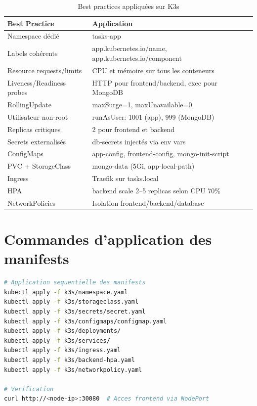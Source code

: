 \documentclass[12pt,a4paper]{report}
\begin{document}
\begin{table}[h]
\centering
\begin{tabular}{|l|p{8cm}|}
\hline
\textbf{Best Practice} & \textbf{Application} \\
\hline
Namespace dédié & tasks-app \\
Labels cohérents & app.kubernetes.io/name, app.kubernetes.io/component \\
Resource requests/limits & CPU et mémoire sur tous les conteneurs \\
Liveness/Readiness probes & HTTP pour frontend/backend, exec pour MongoDB \\
RollingUpdate & maxSurge=1, maxUnavailable=0 \\
Utilisateur non-root & runAsUser: 1001 (app), 999 (MongoDB) \\
Replicas critiques & 2 pour frontend et backend \\
Secrets externalisés & db-secrets injectés via env vars \\
ConfigMaps & app-config, frontend-config, mongo-init-script \\
PVC + StorageClass & mongo-data (5Gi, app-local-path) \\
Ingress & Traefik sur tasks.local \\
HPA & backend scale 2--5 replicas selon CPU 70\% \\
NetworkPolicies & Isolation frontend/backend/database \\
\hline
\end{tabular}
\caption{Best practices appliquées sur K3s}
\end{table}

\section{Commandes d'application des manifests}

\begin{lstlisting}[language=bash]
# Application sequentielle des manifests
kubectl apply -f k3s/namespace.yaml
kubectl apply -f k3s/storageclass.yaml
kubectl apply -f k3s/secrets/secret.yaml
kubectl apply -f k3s/configmaps/configmap.yaml
kubectl apply -f k3s/deployments/
kubectl apply -f k3s/services/
kubectl apply -f k3s/ingress.yaml
kubectl apply -f k3s/backend-hpa.yaml
kubectl apply -f k3s/networkpolicy.yaml

# Verification
curl http://<node-ip>:30080  # Acces frontend via NodePort
\end{lstlisting}
\end{document}
